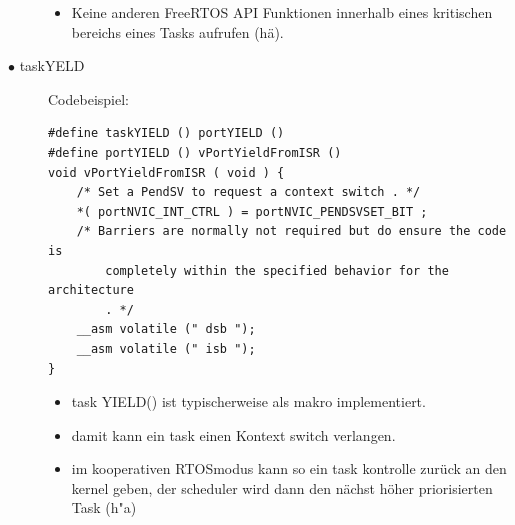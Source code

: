 \documentclass[a4paper, 8pt]{extarticle}
\begin{document}
\begin{multicols*}{3}
\begin{description}
\begin{itemize}
							\item Keine anderen FreeRTOS API Funktionen innerhalb eines kritischen bereichs eines Tasks aufrufen (hä).
						\end{itemize}
					\item[$\bullet$ taskYELD]
					Codebeispiel: 
						\begin{lstlisting}
#define taskYIELD () portYIELD ()
#define portYIELD () vPortYieldFromISR ()
void vPortYieldFromISR ( void ) {
	/* Set a PendSV to request a context switch . */
	*( portNVIC_INT_CTRL ) = portNVIC_PENDSVSET_BIT ;
	/* Barriers are normally not required but do ensure the code is
		completely within the specified behavior for the architecture
		. */
	__asm volatile (" dsb ");
	__asm volatile (" isb ");
}
						\end{lstlisting}
						\begin{itemize}
							\item task YIELD() ist typischerweise als makro implementiert. 
							\item damit kann ein task einen Kontext switch verlangen.
							\item im kooperativen RTOSmodus kann so ein task kontrolle zurück an den kernel geben, der scheduler wird dann
								  den nächst höher priorisierten Task (h"a)
						\end{itemize}
					\end{description}

\end{multicols*}
\end{document}
